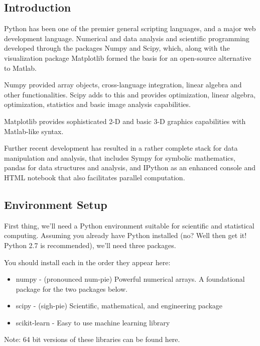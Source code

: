 \documentclass[11pt]{article} %
\begin{document}
\subsection*{Introduction}

Python has been one of the premier general scripting languages, and a major web development language. 
Numerical and data analysis and scientific programming developed through the packages Numpy and Scipy, 
which, along with the visualization package Matplotlib formed the basis for an open-source alternative to Matlab. 

Numpy provided array objects, cross-language integration, linear algebra and other functionalities. 
Scipy adds to this and provides optimization, linear algebra, optimization, statistics and basic image analysis 
capabilities. 

Matplotlib provides sophisticated 2-D and basic 3-D graphics capabilities with Matlab-like syntax.


Further recent development has resulted in a rather complete stack for data manipulation and analysis, that includes Sympy for symbolic mathematics, pandas for data structures and analysis, and IPython as an enhanced console and HTML notebook that also facilitates parallel computation.



\newpage
\subsection{Environment Setup}

First thing, we'll need a Python environment suitable for scientific and statistical computing. Assuming you already have Python installed (no? Well then get it! Python 2.7 is recommended), we'll need three packages. 

You should install each in the order they appear here:

\begin{itemize}
\item numpy - (pronounced num-pie) Powerful numerical arrays. A foundational package for the two packages below.
\item scipy - (sigh-pie) Scientific, mathematical, and engineering package
\item scikit-learn - Easy to use machine learning library
\end{itemize}

Note: 64 bit versions of these libraries can be found here.
\end{document}
